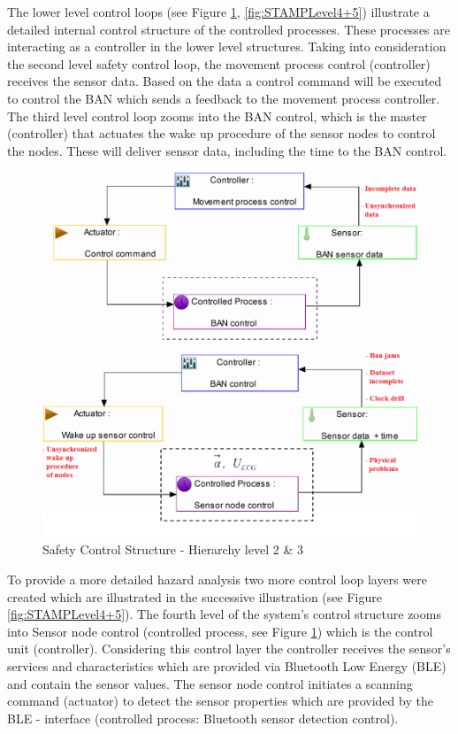 \documentclass[review]{elsarticle}
\begin{document}
\begin{itemize}
	The lower level control loops (see Figure \ref{fig:STAMPLevel2+3}, \ref{fig:STAMPLevel4+5}) illustrate a detailed internal control structure of the controlled processes. These processes are interacting as a controller in the lower level structures. Taking into consideration the second level safety control loop, the movement process control (controller) receives the sensor data. Based on the data a control command will be executed to control the BAN which sends a feedback to the movement process controller. The third level control loop zooms into the BAN control, which is the master (controller) that actuates the wake up procedure of the sensor nodes to control the nodes. These will deliver sensor data, including the time to the BAN control.
	\begin{figure}[!ht]
		\centering
		\includegraphics[scale=0.41]{images/STAMP2+3level(2)}
		\caption[Safety Control Structure - Hierarchy level 2 \& 3]{Safety Control Structure - Hierarchy level 2 \& 3}
		\label{fig:STAMPLevel2+3}
	\end{figure}

 	To provide a more detailed hazard analysis two more control loop layers were created which are illustrated in the successive illustration (see Figure  \ref{fig:STAMPLevel4+5}). The fourth level of the system's control structure zooms into Sensor node control (controlled process, see Figure \ref{fig:STAMPLevel2+3}) which is the control unit (controller). Considering this control layer the controller receives the sensor's services and characteristics which are provided via Bluetooth Low Energy (BLE) and contain the sensor values. The sensor node control initiates a scanning command (actuator) to detect the sensor properties which are provided by the BLE - interface (controlled process: Bluetooth sensor detection control).  
	

\end{itemize}
\end{document}
